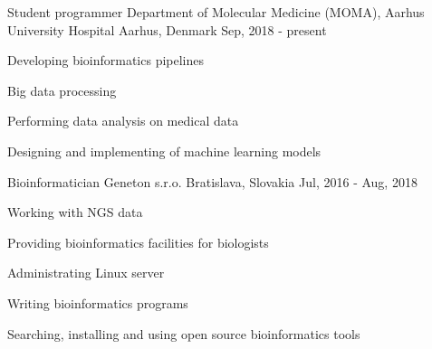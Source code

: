 
\begin{cventries}

\cventry
    {Student programmer} %
    {Department of Molecular Medicine (MOMA), Aarhus University Hospital} %
    {Aarhus, Denmark} %
    {Sep, 2018 - present} %
    {
        \begin{cvitems} %
            \item {Developing bioinformatics pipelines} 
            \item {Big data processing}
            \item {Performing data analysis on medical data}
            \item {Designing and implementing of machine learning models}
        \end{cvitems}
    }

\cventry
    {Bioinformatician} %
    {Geneton s.r.o.} %
    {Bratislava, Slovakia} %
    {Jul, 2016 - Aug, 2018} %
    {
        \begin{cvitems} %
            \item {Working with NGS data}
            \item {Providing bioinformatics facilities for biologists}
            \item {Administrating Linux server}
            \item {Writing bioinformatics programs}
            \item {Searching, installing and using open source bioinformatics tools}
        \end{cvitems}
    }

\end{cventries}
